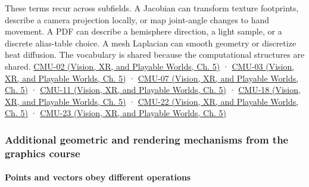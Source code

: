 These terms recur across subfields. A Jacobian can transform texture footprints, describe a camera projection locally, or map joint-angle changes to hand movement. A PDF can describe a hemisphere direction, a light sample, or a discrete alias-table choice. A mesh Laplacian can smooth geometry or discretize heat diffusion. The vocabulary is shared because the computational structures are shared. \href{../07-Vision-XR-and-Playable-Worlds/main.pdf\#nameddest=04-visual-computing-ii-ch036-cmu-02---linear-algebra-preview}{CMU-02 (Vision, XR, and Playable Worlds, Ch. 5)} · \href{../07-Vision-XR-and-Playable-Worlds/main.pdf\#nameddest=04-visual-computing-ii-ch036-cmu-03---vector-calculus-preview}{CMU-03 (Vision, XR, and Playable Worlds, Ch. 5)} · \href{../07-Vision-XR-and-Playable-Worlds/main.pdf\#nameddest=04-visual-computing-ii-ch036-cmu-07---perspective-projection-and-texture-mapping}{CMU-07 (Vision, XR, and Playable Worlds, Ch. 5)} · \href{../07-Vision-XR-and-Playable-Worlds/main.pdf\#nameddest=04-visual-computing-ii-ch036-cmu-11---digital-geometry-processing}{CMU-11 (Vision, XR, and Playable Worlds, Ch. 5)} · \href{../07-Vision-XR-and-Playable-Worlds/main.pdf\#nameddest=04-visual-computing-ii-ch036-cmu-18---monte-carlo-rendering}{CMU-18 (Vision, XR, and Playable Worlds, Ch. 5)} · \href{../07-Vision-XR-and-Playable-Worlds/main.pdf\#nameddest=04-visual-computing-ii-ch036-cmu-22---optimization}{CMU-22 (Vision, XR, and Playable Worlds, Ch. 5)} · \href{../07-Vision-XR-and-Playable-Worlds/main.pdf\#nameddest=04-visual-computing-ii-ch036-cmu-23---physically-based-animation-and-pdes}{CMU-23 (Vision, XR, and Playable Worlds, Ch. 5)}

\subsubsection{Additional geometric and rendering mechanisms from the graphics course}\label{03-visual-computing-i-ch001-additional-geometric-and-rendering-mechanisms-from-the-graphics-course}

\hypertarget{03-visual-computing-i-ch001-additional-geometric-and-rendering-mechanisms-from-the-graphics-course}{}

\paragraph{Points and vectors obey different operations}\label{03-visual-computing-i-ch001-points-and-vectors-obey-different-operations}

\hypertarget{03-visual-computing-i-ch001-points-and-vectors-obey-different-operations}{}

